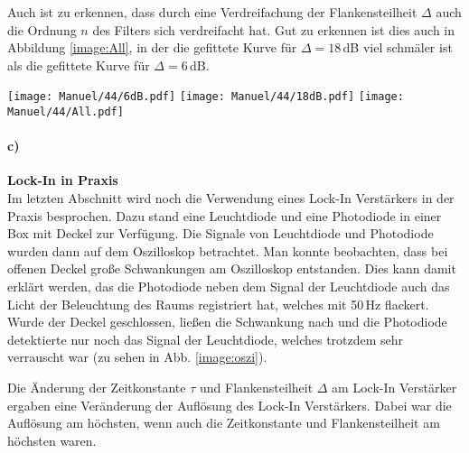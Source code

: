 Auch ist zu erkennen, dass durch eine Verdreifachung der Flankensteilheit $\Delta$ auch die Ordnung $n$ des Filters sich verdreifacht hat. Gut zu erkennen ist dies auch in Abbildung \ref{image:All}, in der die gefittete Kurve für $\Delta=18$\,dB viel schmäler ist als die gefittete Kurve für $\Delta=6$\,dB.
\newpage
\begin{center}
    \texttt{[image: Manuel/44/6dB.pdf]}
    \label{image:6dB}
    \vspace{1cm}
    \texttt{[image: Manuel/44/18dB.pdf]}
    \label{image:18dB}
    \vspace{1cm}
    \texttt{[image: Manuel/44/All.pdf]}
    \label{image:All}
\end{center}
\paragraph{c)}\textbf{Lock-In in Praxis}\\
Im letzten Abschnitt wird noch die Verwendung eines Lock-In Verstärkers in der Praxis besprochen. Dazu stand eine Leuchtdiode und eine Photodiode in einer Box mit Deckel zur Verfügung. Die Signale von Leuchtdiode und Photodiode wurden dann auf dem Oszilloskop betrachtet. Man konnte beobachten, dass bei offenen Deckel große Schwankungen am Oszilloskop entstanden. Dies kann damit erklärt werden, das die Photodiode neben dem Signal der Leuchtdiode auch das Licht der Beleuchtung des Raums registriert hat, welches mit 50\,Hz flackert. Wurde der Deckel geschlossen, ließen die Schwankung nach und die Photodiode detektierte nur noch das Signal der Leuchtdiode, welches trotzdem sehr verrauscht war (zu sehen in Abb. \ref{image:oszi}). 

Die Änderung der Zeitkonstante $\tau$ und Flankensteilheit $\Delta$ am Lock-In Verstärker ergaben eine Veränderung der Auflösung des Lock-In Verstärkers. Dabei war die Auflösung am höchsten, wenn auch die Zeitkonstante und Flankensteilheit am höchsten waren.
